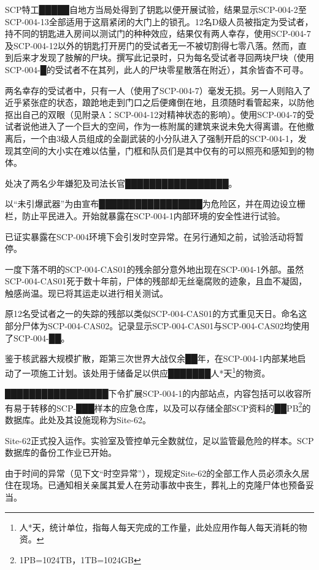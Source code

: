 SCP特工█████自地方当局处得到了钥匙以便开展试验，结果显示SCP-004-2至SCP-004-13全部适用于这扇紧闭的大门上的锁孔。12名D级人员被指定为受试者，持不同的钥匙进入房间以测试门的种种效应，结果仅有两人幸存，使用SCP-004-7及SCP-004-12以外的钥匙打开房门的受试者无一不被切割得七零八落。然而，直到后来才发现了肢解的尸块。撰写此记录时，只为每名受试者寻回两块尸块（使用SCP-004-█的受试者不在其列，此人的尸块零星散落在附近），其余皆杳不可寻。

两名幸存的受试者中，只有一人（使用了SCP-004-7）毫发无损。另一人则陷入了近乎紧张症的状态，踉跄地走到门口之后便瘫倒在地，且须随时看管起来，以防他抠出自己的双眼（见附录A：SCP-004-12对精神状态的影响）。使用SCP-004-7的受试者说他进入了一个巨大的空间，作为一栋附属的建筑来说未免大得离谱。在他撤离后，一个由3级人员组成的全副武装的小分队进入了强制开启的SCP-004-1，发现其空间的大小实在难以估量，门框和队员们是其中仅有的可以照亮和感知到的物体。

处决了两名少年嫌犯及司法长官█████████████████。

以“未引爆武器”为由宣布█████████████████为危险区，并在周边设立栅栏，防止平民进入。开始就暴露在SCP-004-1内部环境的安全性进行试验。

已证实暴露在SCP-004环境下会引发时空异常。在另行通知之前，试验活动将暂停。

一度下落不明的SCP-004-CAS01的残余部分意外地出现在SCP-004-1外部。虽然SCP-004-CAS01死于数十年前，尸体的残部却无丝毫腐败的迹象，且血不凝固，触感尚温。现已将其运走以进行相关测试。

原12名受试者之一的失踪的残部以类似SCP-004-CAS01的方式重见天日。命名这部分尸体为SCP-004-CAS02。记录显示SCP-004-CAS01与SCP-004-CAS02均使用了SCP-004-██。

鉴于核武器大规模扩散，距第三次世界大战仅余██年，在SCP-004-1内部某地启动了一项施工计划。该处用于储备足以供应███████人*天\footnote{人*天，统计单位，指每人每天完成的工作量，此处应用作每人每天消耗的物资。}的物资。

█████████████████下令扩展SCP-004-1的内部站点，内容包括可以收容所有易于转移的SCP-███样本的应急仓库，以及可以存储全部SCP资料的██PB\footnote{1PB=1024TB，1TB=1024GB}的数据库。此处及其设施现称为Site-62。

Site-62正式投入运作。实验室及管控单元全数就位，足以监管最危险的样本。SCP数据库的备份工作业已开始。

由于时间的异常（见下文“时空异常”），现规定Site-62的全部工作人员必须永久居住在现场。已通知相关亲属其爱人在劳动事故中丧生，葬礼上的克隆尸体也预备妥当。

